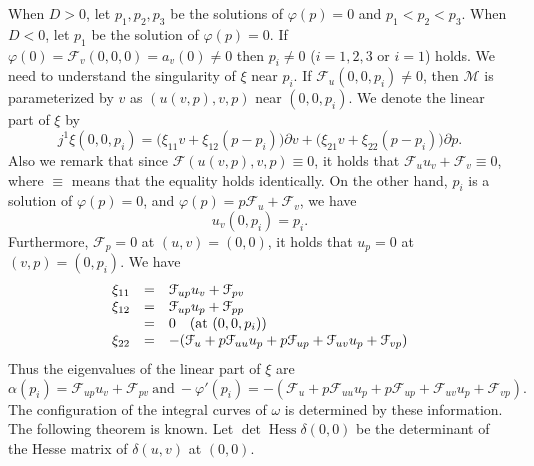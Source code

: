 \documentclass[a4paper, 12pt]{article}
\theoremstyle{definition}
\numberwithin{equation}{section}
\begin{document}
When $D>0$,
let $p_1,p_2,p_3$ be the solutions of ${\varphi}(p)=0$ and
$p_1<p_2<p_3$.
When $D<0$,
let $p_1$ be the solution of ${\varphi}(p)=0$.
If ${\varphi}(0)={\mathcal{F}}_v(0,0,0)=a_v(0)\ne0$ then
$p_i\ne0$ ($i=1,2,3$ or $i=1$) holds.
We need to understand the singularity of $\xi$ near $p_i$.
If ${\mathcal{F}}_u(0,0,p_i)\ne0$,
then ${\mathcal{M}}$ is parameterized by $v$ as $(u(v,p),v,p)$ near $(0,0,p_i)$.
We denote the linear part of $\xi$ by
$$
j^1\xi(0,0,p_i)=
\big(\xi_{11}v+\xi_{12}(p-p_i)\big)\partial v
+
\big(\xi_{21}v+\xi_{22}(p-p_i)\big)\partial p.
$$
Also we remark that since
${\mathcal{F}}(u(v,p),v,p)\equiv0$,
it holds that
${\mathcal{F}}_uu_v+{\mathcal{F}}_v\equiv0$,
where
$\equiv$ means that the equality holds identically.
On the other hand, $p_i$ is a solution of ${\varphi}(p)=0$,
and ${\varphi}(p)=p{\mathcal{F}}_u+{\mathcal{F}}_v$,
we have
$$
u_v(0,p_i)=p_i.
$$
Furthermore, ${\mathcal{F}}_p=0$ at $(u,v)=(0,0)$, it holds that
$u_p=0$ at $(v,p)=(0,p_i)$.
We have
$$
\begin{array}{rcll}
\xi_{11}
&=&{\mathcal{F}}_{up}u_v+{\mathcal{F}}_{pv}\\
\xi_{12}
&=&{\mathcal{F}}_{up}u_p+{\mathcal{F}}_{pp}\\
&=&0\quad({\rm at}\ (0,0,p_i))
\\
\xi_{22}
&=&-({\mathcal{F}}_u+p{\mathcal{F}}_{uu}u_p+p{\mathcal{F}}_{up}+{\mathcal{F}}_{uv}u_p+{\mathcal{F}}_{vp})\\
\end{array}
$$
Thus the eigenvalues of the linear part of $\xi$
are
\begin{equation}\label{eq:defslphaphiprime}
\alpha(p_i)=
{\mathcal{F}}_{up}u_v+{\mathcal{F}}_{pv}\ 
\text{and}\ 
-{\varphi}'(p_i)=
-({\mathcal{F}}_u+p{\mathcal{F}}_{uu}u_p+p{\mathcal{F}}_{up}+{\mathcal{F}}_{uv}u_p+{\mathcal{F}}_{vp}).
\end{equation}
The configuration of the integral curves of $\omega$
is determined by these information.
The following theorem is known.
Let $\det{\operatorname{Hess}}\delta(0,0)$ be
the determinant of the Hesse matrix of $\delta(u,v)$ at $(0,0)$.
\end{document}
